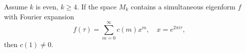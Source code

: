 Assume $k$ is even, $k \geq 4$. If the space $M_k$ contains a simultaneous eigenform $f$ with Fourier expansion
$$f(\tau) = \sum_{m=0}^{\infty} c(m)x^m, \quad x = e^{2\pi i\tau},$$
then $c(1) \neq 0$.
